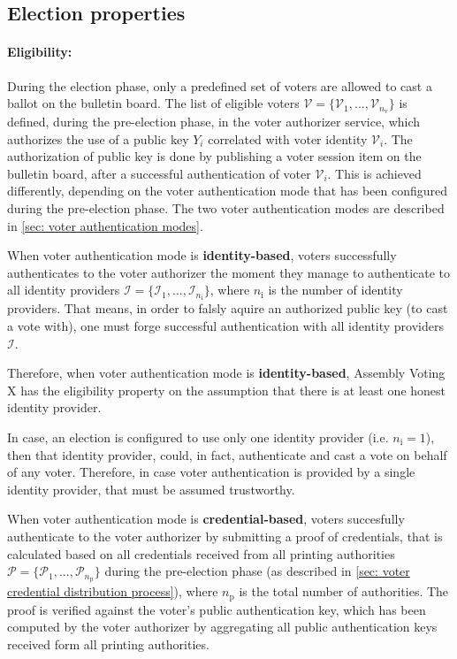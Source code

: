\subsection{Election properties} \label{sec: election properties}


\paragraph{Eligibility:}
During the election phase, only a predefined set of voters are allowed to cast a ballot on the bulletin board. The list of eligible voters $\boldsymbol{\mathcal{V}} = \{ \mathcal{V}_1, ..., \mathcal{V}_{n_\mathrm{v}} \}$ is defined, during the pre-election phase, in the voter authorizer service, which authorizes the use of a public key $Y_i$ correlated with voter identity $\mathcal{V}_i$. The authorization of public key is done by publishing a voter session item on the bulletin board, after a successful authentication of voter $\mathcal{V}_i$. This is achieved differently, depending on the voter authentication mode that has been configured during the pre-election phase. The two voter authentication modes are described in \cref{sec: voter authentication modes}.

When voter authentication mode is \textbf{identity-based}, voters successfully authenticates to the voter authorizer the moment they manage to authenticate to all identity providers $\boldsymbol{\mathcal{I}} = \{ \mathcal{I}_1, ..., \mathcal{I}_{n_\mathrm{i}} \}$, where $n_\mathrm{i}$ is the number of identity providers. That means, in order to falsly aquire an authorized public key (to cast a vote with), one must forge successful authentication with all identity providers $\boldsymbol{\mathcal{I}}$.

Therefore, when voter authentication mode is \textbf{identity-based}, Assembly Voting X has the eligibility property on the assumption that there is at least one honest identity provider.

In case, an election is configured to use only one identity provider (i.e. $n_\mathrm{i} = 1$), then that identity provider, could, in fact, authenticate and cast a vote on behalf of any voter. Therefore, in case voter authentication is provided by a single identity provider, that must be assumed trustworthy.

When voter authentication mode is \textbf{credential-based}, voters  succesfully authenticate to the voter authorizer by submitting a proof of credentials, that is calculated based on all credentials received from all printing authorities $\boldsymbol{\mathcal{P}} = \{ \mathcal{P}_1, ..., \mathcal{P}_{n_\mathrm{p}} \}$ during the pre-election phase (as described in \cref{sec: voter credential distribution process}), where $n_\mathrm{p}$ is the total number of authorities. The proof is verified against the voter's public authentication key, which has been computed by the voter authorizer by aggregating all public authentication keys received form all printing authorities.

